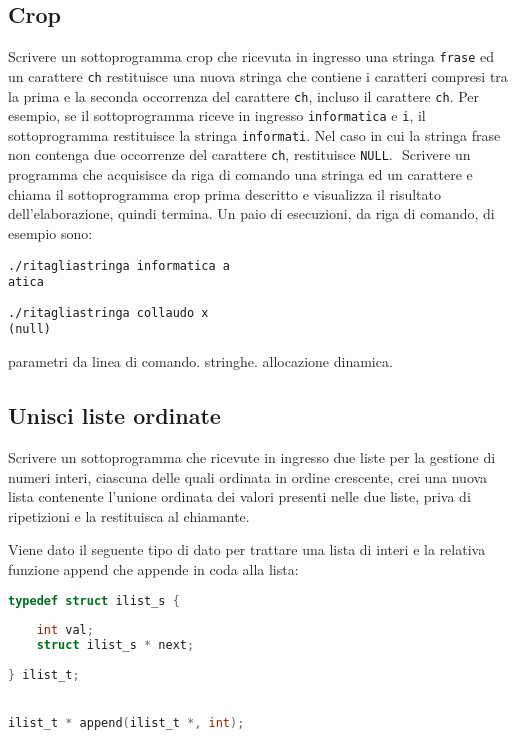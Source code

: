 \subsection{Crop}
Scrivere un sottoprogramma crop che ricevuta in ingresso una stringa \texttt{frase} ed un carattere \texttt{ch} restituisce una nuova stringa che contiene i caratteri compresi tra la prima e la seconda occorrenza del carattere \texttt{ch}, incluso il carattere \texttt{ch}. Per esempio, se il sottoprogramma riceve in ingresso \texttt{informatica} e \texttt{i}, il sottoprogramma restituisce la stringa \texttt{informati}. 
Nel caso in cui la stringa frase non contenga due occorrenze del carattere \texttt{ch}, restituisce \texttt{NULL}.
​
Scrivere un programma che acquisisce da riga di comando una stringa ed un carattere e chiama il sottoprogramma crop prima descritto e visualizza il risultato dell’elaborazione, quindi termina. 
Un paio di esecuzioni, da riga di comando, di esempio sono:​
\begin{verbatim}
./ritagliastringa informatica a ​
atica ​
\end{verbatim}
\begin{verbatim}
./ritagliastringa collaudo x ​
(null) ​
\end{verbatim}

\begin{tags}
parametri da linea di comando. stringhe. allocazione dinamica.
\end{tags}


\subsection{Unisci liste ordinate}
Scrivere un sottoprogramma che ricevute in ingresso due liste per la gestione di numeri interi, ciascuna delle quali ordinata in ordine crescente, crei una nuova lista contenente l'unione ordinata dei valori presenti nelle due liste, priva di ripetizioni e la restituisca al chiamante.

Viene dato il seguente tipo di dato per trattare una lista di interi e la relativa funzione append che appende in coda alla lista:

\begin{lstlisting}[language=c]
typedef struct ilist_s {
    
    int val;
    struct ilist_s * next;
    
} ilist_t;


ilist_t * append(ilist_t *, int);
\end{lstlisting}

